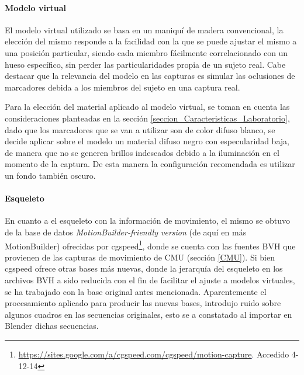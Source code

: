 \paragraph{Modelo virtual}  
El modelo virtual utilizado se basa en un maniquí de madera convencional, la elección del mismo responde a la facilidad con la que se puede ajustar el mismo a una posición particular, siendo cada miembro fácilmente correlacionado con un hueso específico, sin perder las particularidades propia de un sujeto real. Cabe destacar que la relevancia del modelo en las capturas es simular las oclusiones de marcadores debida a los miembros del sujeto en una captura real.  

Para la elección del material aplicado al modelo virtual, se toman en cuenta las consideraciones planteadas en la sección \ref{seccion_Caracteristicas_Laboratorio}, dado que los marcadores que se van a utilizar son de color difuso blanco, se decide aplicar sobre el modelo un material difuso negro con especularidad baja, de manera que no se generen brillos indeseados debido a la iluminación en el momento de la captura. De esta manera la configuración recomendada es utilizar un fondo también oscuro.

\paragraph{Esqueleto}
En cuanto a el esqueleto con la información de movimiento, el mismo se obtuvo de la base de datos \textit{MotionBuilder-friendly version} (de aquí en más MotionBuilder) ofrecidas por cgspeed\footnote{\textcolor{blue}{\underline{\url{https://sites.google.com/a/cgspeed.com/cgspeed/motion-capture}}}. Accedido 4-12-14},
 donde se cuenta con las fuentes BVH que provienen de las capturas de movimiento de CMU (sección \ref{CMU}). Si bien cgspeed ofrece otras bases más nuevas, donde la jerarquía del esqueleto en los archivos BVH a sido reducida con el fin de facilitar el ajuste a modelos virtuales, se ha trabajado con la base original antes mencionada. Aparentemente el procesamiento aplicado para producir las nuevas bases, introdujo ruido sobre algunos cuadros en las secuencias originales, esto se a constatado al importar en Blender dichas secuencias.
      

